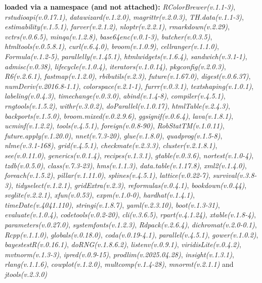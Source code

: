 \documentclass[
  bookmarksnumbered]{article}
\begin{document}
\textbf{loaded via a namespace (and not attached):}
\emph{RColorBrewer(v.1.1-3)}, \emph{rstudioapi(v.0.17.1)}, \emph{datawizard(v.1.2.0)}, \emph{magrittr(v.2.0.3)}, \emph{TH.data(v.1.1-3)}, \emph{estimability(v.1.5.1)}, \emph{farver(v.2.1.2)}, \emph{nloptr(v.2.2.1)}, \emph{rmarkdown(v.2.29)}, \emph{vctrs(v.0.6.5)}, \emph{minqa(v.1.2.8)}, \emph{base64enc(v.0.1-3)}, \emph{butcher(v.0.3.5)}, \emph{htmltools(v.0.5.8.1)}, \emph{curl(v.6.4.0)}, \emph{broom(v.1.0.9)}, \emph{cellranger(v.1.1.0)}, \emph{Formula(v.1.2-5)}, \emph{parallelly(v.1.45.1)}, \emph{htmlwidgets(v.1.6.4)}, \emph{sandwich(v.3.1-1)}, \emph{admisc(v.0.38)}, \emph{lifecycle(v.1.0.4)}, \emph{iterators(v.1.0.14)}, \emph{pkgconfig(v.2.0.3)}, \emph{R6(v.2.6.1)}, \emph{fastmap(v.1.2.0)}, \emph{rbibutils(v.2.3)}, \emph{future(v.1.67.0)}, \emph{digest(v.0.6.37)}, \emph{numDeriv(v.2016.8-1.1)}, \emph{colorspace(v.2.1-1)}, \emph{furrr(v.0.3.1)}, \emph{textshaping(v.1.0.1)}, \emph{labeling(v.0.4.3)}, \emph{timechange(v.0.3.0)}, \emph{abind(v.1.4-8)}, \emph{compiler(v.4.5.1)}, \emph{rngtools(v.1.5.2)}, \emph{withr(v.3.0.2)}, \emph{doParallel(v.1.0.17)}, \emph{htmlTable(v.2.4.3)}, \emph{backports(v.1.5.0)}, \emph{broom.mixed(v.0.2.9.6)}, \emph{ggsignif(v.0.6.4)}, \emph{lava(v.1.8.1)}, \emph{ucminf(v.1.2.2)}, \emph{tools(v.4.5.1)}, \emph{foreign(v.0.8-90)}, \emph{RobStatTM(v.1.0.11)}, \emph{future.apply(v.1.20.0)}, \emph{nnet(v.7.3-20)}, \emph{glue(v.1.8.0)}, \emph{quadprog(v.1.5-8)}, \emph{nlme(v.3.1-168)}, \emph{grid(v.4.5.1)}, \emph{checkmate(v.2.3.3)}, \emph{cluster(v.2.1.8.1)}, \emph{see(v.0.11.0)}, \emph{generics(v.0.1.4)}, \emph{recipes(v.1.3.1)}, \emph{gtable(v.0.3.6)}, \emph{nortest(v.1.0-4)}, \emph{tzdb(v.0.5.0)}, \emph{class(v.7.3-23)}, \emph{hms(v.1.1.3)}, \emph{data.table(v.1.17.8)}, \emph{xml2(v.1.4.0)}, \emph{foreach(v.1.5.2)}, \emph{pillar(v.1.11.0)}, \emph{splines(v.4.5.1)}, \emph{lattice(v.0.22-7)}, \emph{survival(v.3.8-3)}, \emph{tidyselect(v.1.2.1)}, \emph{gridExtra(v.2.3)}, \emph{reformulas(v.0.4.1)}, \emph{bookdown(v.0.44)}, \emph{svglite(v.2.2.1)}, \emph{xfun(v.0.53)}, \emph{expm(v.1.0-0)}, \emph{hardhat(v.1.4.1)}, \emph{timeDate(v.4041.110)}, \emph{stringi(v.1.8.7)}, \emph{yaml(v.2.3.10)}, \emph{boot(v.1.3-31)}, \emph{evaluate(v.1.0.4)}, \emph{codetools(v.0.2-20)}, \emph{cli(v.3.6.5)}, \emph{rpart(v.4.1.24)}, \emph{xtable(v.1.8-4)}, \emph{parameters(v.0.27.0)}, \emph{systemfonts(v.1.2.3)}, \emph{Rdpack(v.2.6.4)}, \emph{dichromat(v.2.0-0.1)}, \emph{Rcpp(v.1.1.0)}, \emph{globals(v.0.18.0)}, \emph{coda(v.0.19-4.1)}, \emph{parallel(v.4.5.1)}, \emph{gower(v.1.0.2)}, \emph{bayestestR(v.0.16.1)}, \emph{doRNG(v.1.8.6.2)}, \emph{listenv(v.0.9.1)}, \emph{viridisLite(v.0.4.2)}, \emph{mvtnorm(v.1.3-3)}, \emph{ipred(v.0.9-15)}, \emph{prodlim(v.2025.04.28)}, \emph{insight(v.1.3.1)}, \emph{rlang(v.1.1.6)}, \emph{cowplot(v.1.2.0)}, \emph{multcomp(v.1.4-28)}, \emph{mnormt(v.2.1.1)} and \emph{jtools(v.2.3.0)}
\end{document}
